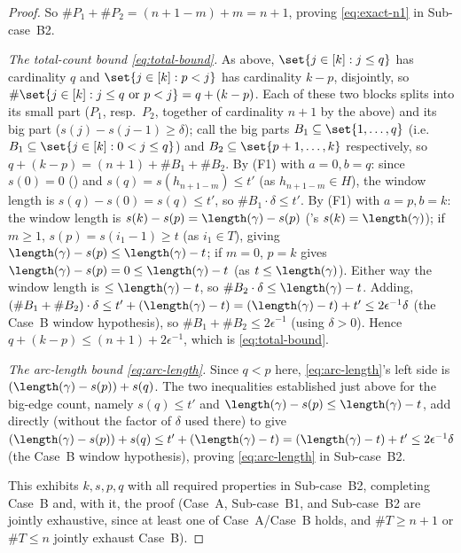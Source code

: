 \begin{proof}
  So $\#P_1+\#P_2 = (n+1-m)+m = n+1$, proving \eqref{eq:exact-n1} in Sub-case~B2.

  \emph{The total-count bound \eqref{eq:total-bound}.} As above, $\set{j\in[k]:j\le q}$ has
  cardinality $q$ and $\set{j\in[k]:p<j}$ has cardinality $k-p$, disjointly, so
  $\#\set{j\in[k]:j\le q\text{ or }p<j} = q + (k-p)$. Each of these two blocks splits into its
  small part ($P_1$, resp.\ $P_2$, together of cardinality $n+1$ by the above) and its big part
  ($s(j)-s(j-1)\ge\delta$); call the big parts $B_1\subseteq\set{1,\dots,q}$ (i.e.\ $B_1\subseteq
  \set{j\in[k]:0<j\le q}$) and $B_2\subseteq\set{p+1,\dots,k}$ respectively, so
  $q+(k-p) = (n+1) + \#B_1+\#B_2$.
  By (F1) with $a=0,b=q$: since $s(0)=0$ () and $s(q)=s(h_{n+1-m})
  \le t'$ (as $h_{n+1-m}\in H$), the window length is $s(q)-s(0)=s(q)\le t'$, so $\#B_1\cdot\delta
  \le t'$.
  By (F1) with $a=p,b=k$: the window length is $s(k)-s(p)=\length(\gamma)-s(p)$
  ('s $s(k)=\length(\gamma)$); if $m\ge1$, $s(p)=s(i_1-1)\ge t$ (as
  $i_1\in T$), giving $\length(\gamma)-s(p)\le\length(\gamma)-t$; if $m=0$, $p=k$ gives
  $\length(\gamma)-s(p)=0\le\length(\gamma)-t$ (as $t\le\length(\gamma)$). Either way the window
  length is $\le\length(\gamma)-t$, so $\#B_2\cdot\delta\le\length(\gamma)-t$.
  Adding, $(\#B_1+\#B_2)\cdot\delta \le t'+(\length(\gamma)-t) = (\length(\gamma)-t)+t' \le
  2\epsilon^{-1}\delta$ (the Case~B window hypothesis), so $\#B_1+\#B_2\le2\epsilon^{-1}$ (using
  $\delta>0$). Hence $q+(k-p) \le (n+1)+2\epsilon^{-1}$, which is \eqref{eq:total-bound}.

  \emph{The arc-length bound \eqref{eq:arc-length}.} Since $q<p$ here, \eqref{eq:arc-length}'s left
  side is $(\length(\gamma)-s(p))+s(q)$. The two inequalities established just above for the big-edge
  count, namely $s(q)\le t'$ and $\length(\gamma)-s(p)\le\length(\gamma)-t$, add directly (without
  the factor of $\delta$ used there) to give $(\length(\gamma)-s(p))+s(q) \le t'+(\length(\gamma)-t)
  = (\length(\gamma)-t)+t' \le 2\epsilon^{-1}\delta$ (the Case~B window hypothesis), proving
  \eqref{eq:arc-length} in Sub-case~B2.

  This exhibits $k,s,p,q$ with all required properties in Sub-case~B2, completing Case~B and, with
  it, the proof (Case~A, Sub-case~B1, and Sub-case~B2 are jointly exhaustive, since at least one of
  Case~A/Case~B holds, and $\#T\ge n+1$ or $\#T\le n$ jointly exhaust Case~B).
\end{proof}
